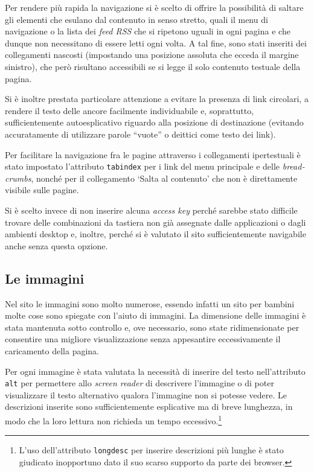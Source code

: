 \documentclass[10pt,a4paper,onecolumn]{article}
\newcommand{\inglese}[1]{\foreignlanguage{english}{\itshape{}#1}}
\begin{document}
Per rendere più rapida la navigazione si è scelto di offrire la possibilità di saltare gli elementi che esulano dal contenuto in senso stretto, quali il menu di navigazione o la lista dei \inglese{feed RSS} che si ripetono uguali in ogni pagina e che dunque non necessitano di essere letti ogni volta. A tal fine, sono stati inseriti dei collegamenti nascosti (impostando una posizione assoluta che ecceda il margine sinistro), che però risultano accessibili se si legge il solo contenuto testuale della pagina.

Si è inoltre prestata particolare attenzione a evitare la presenza di link circolari, a rendere il testo delle ancore facilmente individuabile e, soprattutto, sufficientemente autoesplicativo riguardo alla posizione di destinazione (evitando accuratamente di utilizzare parole ``vuote'' o deittici come testo dei link).

Per facilitare la navigazione fra le pagine attraverso i collegamenti ipertestuali è stato impostato l'attributo \texttt{tabindex} per i link del menu principale e delle \inglese{breadcrumbs}, nonché per il collegamento `Salta al contenuto' che non è direttamente visibile sulle pagine.

Si è scelto invece di non inserire alcuna \inglese{access key} perché sarebbe stato difficile trovare delle combinazioni da tastiera non già assegnate dalle applicazioni o dagli ambienti desktop e, inoltre, perché si è valutato il sito sufficientemente navigabile anche senza questa opzione.

\subsection{Le immagini}
Nel sito le immagini sono molto numerose, essendo infatti un sito per bambini molte cose sono spiegate con l'aiuto di immagini. La dimensione delle immagini è stata mantenuta sotto controllo e, ove necessario, sono state ridimensionate per consentire una migliore visualizzazione senza appesantire eccessivamente il caricamento della pagina.

Per ogni immagine è stata valutata la necessità di inserire del testo nell'attributo \texttt{alt} per permettere allo \inglese{screen reader} di descrivere l'immagine o di poter visualizzare il testo alternativo qualora l'immagine non si potesse vedere. Le descrizioni inserite sono sufficientemente esplicative ma di breve lunghezza, in modo che la loro lettura non richieda un tempo eccessivo.\footnote{%
    L'uso dell'attributo \texttt{longdesc} per inserire descrizioni più lunghe è stato giudicato inopportuno dato il suo scarso supporto da parte dei browser.
}
\end{document}
